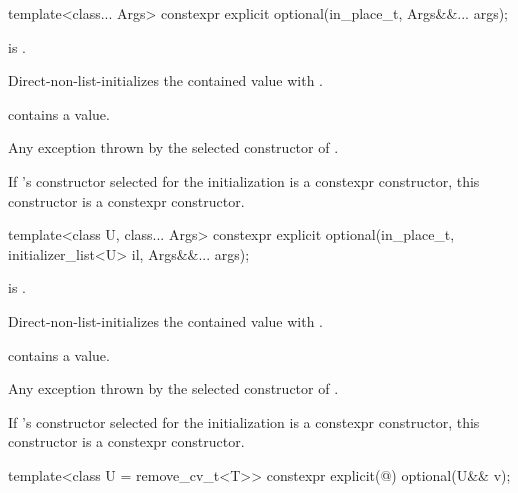 %
\begin{itemdecl}
template<class... Args> constexpr explicit optional(in_place_t, Args&&... args);
\end{itemdecl}

\begin{itemdescr}
\pnum
\constraints
{} is .

\pnum
\effects
Direct-non-list-initializes the contained value with .

\pnum
\ensures
{} contains a value.

\pnum
\throws
Any exception thrown by the selected constructor of .

\pnum
\remarks
If 's constructor selected for the initialization is a constexpr constructor, this constructor is a constexpr constructor.
\end{itemdescr}

%
\begin{itemdecl}
template<class U, class... Args>
  constexpr explicit optional(in_place_t, initializer_list<U> il, Args&&... args);
\end{itemdecl}

\begin{itemdescr}
\pnum
\constraints
{} is .

\pnum
\effects
Direct-non-list-initializes the contained value with .

\pnum
\ensures
{} contains a value.

\pnum
\throws
Any exception thrown by the selected constructor of .

\pnum
\remarks
If 's constructor selected for the initialization is a constexpr constructor, this constructor is a constexpr constructor.
\end{itemdescr}

%
\begin{itemdecl}
template<class U = remove_cv_t<T>> constexpr explicit(@\seebelow@) optional(U&& v);
\end{itemdecl}

